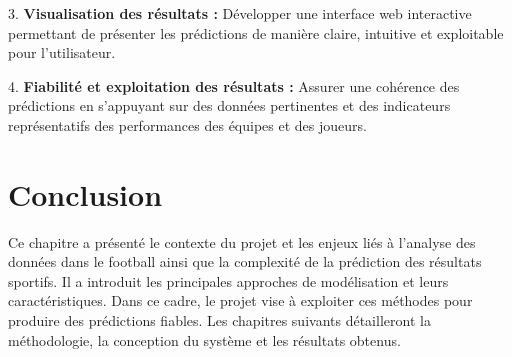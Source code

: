 3. \textbf{Visualisation des résultats :} Développer une interface web interactive permettant de présenter les prédictions de manière claire, intuitive et exploitable pour l’utilisateur.

4. \textbf{Fiabilité et exploitation des résultats :} Assurer une cohérence des prédictions en s’appuyant sur des données pertinentes et des indicateurs représentatifs des performances des équipes et des joueurs.

\section{Conclusion}

Ce chapitre a présenté le contexte du projet et les enjeux liés à l’analyse des données dans le football ainsi que la complexité de la prédiction des résultats sportifs. Il a introduit les principales approches de modélisation et leurs caractéristiques. Dans ce cadre, le projet vise à exploiter ces méthodes pour produire des prédictions fiables. Les chapitres suivants détailleront la méthodologie, la conception du système et les résultats obtenus.
